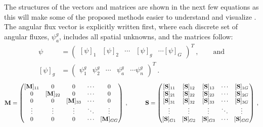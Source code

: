 The structures of the vectors and matrices are shown in the next few equations as this will make some of the proposed methods easier to understand and visualize \cite{Evans2009}. The angular flux vector is explicitly written first, where each discrete set of angular fluxes, $ \psi^g_a$, includes all spatial unknowns, and the matrices follow: 
%
 \begin{align}
    \psi &=     \begin{pmatrix}
    [\psi]_{1} & [\psi]_2 & \cdots & [\psi]_g & \cdots [\psi]_{G} 
  \end{pmatrix}^T  \:, \qquad \text{and} \nonumber \\
    [\psi]_g &= \begin{pmatrix}
    \psi^g_1 & \psi^g_2& \cdots & \psi^g_a & \cdots \psi^g_n 
  \end{pmatrix}^T \:.  \nonumber 
\end{align}
%
\begin{alignat}{2}
  \mathbf{M} &=    \begin{pmatrix}
      [\ve{M}]_{11} & 0 & 0 & \cdots & 0 \\
      0 & [\ve{M}]_{22} & 0 & \cdots & 0 \\
      0 & 0 & [\ve{M}]_{33} & \cdots & 0 \\
      \vdots & \vdots & \vdots & \ddots   & \vdots \\
      0 & 0 & 0 & \cdots & [\ve{M}]_{GG} \\
    \end{pmatrix} \nonumber  \:,& \qquad
  \mathbf{S}  =     \begin{pmatrix}
      [\ve{S}]_{11} & [\ve{S}]_{12} & [\ve{S}]_{13} & \cdots &
      [\ve{S}]_{1G} \\
      [\ve{S}]_{21} & [\ve{S}]_{22} & [\ve{S}]_{23} & \cdots &
      [\ve{S}]_{2G} \\
      [\ve{S}]_{31} & [\ve{S}]_{32} & [\ve{S}]_{33} & \cdots &
      [\ve{S}]_{3G} \\
      \vdots & \vdots & \vdots & \ddots & \vdots \\
      [\ve{S}]_{G1} & [\ve{S}]_{G2} & [\ve{S}]_{G3} & \cdots &
      [\ve{S}]_{GG}
    \end{pmatrix} \nonumber  \:,
 \end{alignat}
